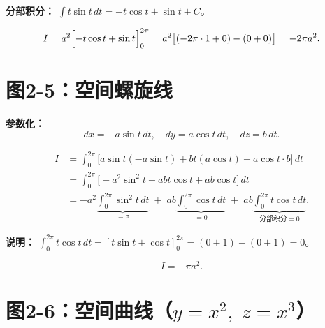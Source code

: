 \documentclass[12pt,a4paper]{ctexart}
\newcommand{\answerbox}[1]{%
  \begin{center}
  \fbox{\color{red}\large\bfseries #1}
  \end{center}
}
\begin{document}
\noindent\textbf{分部积分：} $\int t\sin t\,dt = -t\cos t + \sin t + C$。

\[
I = a^2\Bigl[-t\cos t + \sin t\Bigr]_0^{2\pi}
   = a^2\bigl[(-2\pi\cdot 1 + 0) - (0 + 0)\bigr]
   = -2\pi a^2.
\]

\answerbox{$I = -2\pi a^2$}

\newpage
\section{图2-5：空间螺旋线}


\bigskip

\noindent\textbf{参数化：}
\[
dx = -a\sin t\,dt,\quad dy = a\cos t\,dt,\quad dz = b\,dt.
\]

\[
\begin{aligned}
I &= \int_0^{2\pi} \bigl[a\sin t(-a\sin t) + bt(a\cos t) + a\cos t\cdot b\bigr]\,dt \\[4pt]
  &= \int_0^{2\pi} \bigl[-a^2\sin^2 t + abt\cos t + ab\cos t\bigr]\,dt \\[4pt]
  &= -a^2\underbrace{\int_0^{2\pi}\sin^2 t\,dt}_{=\pi}
     \;+\; ab\underbrace{\int_0^{2\pi}\cos t\,dt}_{=0}
     \;+\; ab\underbrace{\int_0^{2\pi}t\cos t\,dt}_{\text{分部积分}=0}.
\end{aligned}
\]

\noindent\textbf{说明：} $\int_0^{2\pi} t\cos t\,dt = [t\sin t+\cos t]_0^{2\pi} = (0+1)-(0+1)=0$。

\[
I = -\pi a^2.
\]

\answerbox{$I = -\pi a^2$}

\newpage
\section{图2-6：空间曲线（$y=x^2,\;z=x^3$）}

\end{document}
